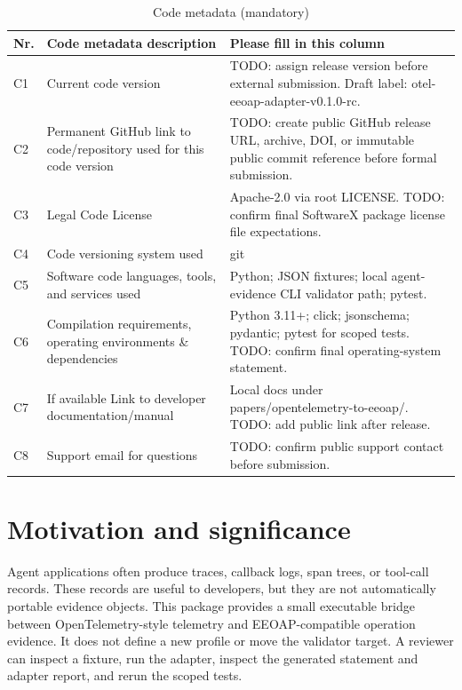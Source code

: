 \documentclass[preprint,12pt,a4paper]{elsarticle}
\begin{document}
\begin{table}[!h]
\begin{tabular}{|l|p{6.5cm}|p{6.5cm}|}
\hline
\textbf{Nr.} & \textbf{Code metadata description} & \textbf{Please fill in this column} \\
\hline
C1 & Current code version & TODO: assign release version before external submission. Draft label: otel-eeoap-adapter-v0.1.0-rc. \\
\hline
C2 & Permanent GitHub link to code/repository used for this code version & TODO: create public GitHub release URL, archive, DOI, or immutable public commit reference before formal submission. \\
\hline
C3 & Legal Code License & Apache-2.0 via root LICENSE. TODO: confirm final SoftwareX package license file expectations. \\
\hline
C4 & Code versioning system used & git \\
\hline
C5 & Software code languages, tools, and services used & Python; JSON fixtures; local agent-evidence CLI validator path; pytest. \\
\hline
C6 & Compilation requirements, operating environments \& dependencies & Python 3.11+; click; jsonschema; pydantic; pytest for scoped tests. TODO: confirm final operating-system statement. \\
\hline
C7 & If available Link to developer documentation/manual & Local docs under papers/opentelemetry-to-eeoap/. TODO: add public link after release. \\
\hline
C8 & Support email for questions & TODO: confirm public support contact before submission. \\
\hline
\end{tabular}
\caption{Code metadata (mandatory)}
\end{table}

\section{Motivation and significance}

Agent applications often produce traces, callback logs, span trees, or
tool-call records. These records are useful to developers, but they are not
automatically portable evidence objects. This package provides a small
executable bridge between OpenTelemetry-style telemetry and EEOAP-compatible
operation evidence. It does not define a new profile or move the validator
target. A reviewer can inspect a fixture, run the adapter, inspect the generated
statement and adapter report, and rerun the scoped tests.
\end{document}
